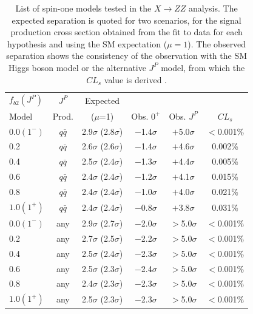 \begin{table}
  \centering
\caption[List of spin-one models tested in the $X \to ZZ$ analysis.
The expected separation is quoted for two scenarios, for the signal production cross section
obtained from the fit to data for each hypothesis and using the SM expectation ($\mu=1$).
The observed separation shows the consistency of the observation with the SM Higgs boson model
or the alternative $J^{P}$ model, from which the $CL_{s}$ value is derived.]{
List of spin-one models tested in the $X \to ZZ$ analysis.
The expected separation is quoted for two scenarios, for the signal production cross section
obtained from the fit to data for each hypothesis and using the SM expectation ($\mu=1$).
The observed separation shows the consistency of the observation with the SM Higgs boson model
or the alternative $J^{P}$ model, from which the $CL_{s}$ value is derived \cite{Khachatryan:2014kca}.
\label{tab:jpmodels_1}
}
\begin{tabular}{lccccc}
$f_{b2} (J^P)$                 & $J^P$        &        Expected  &                       &                    &               \\
Model                          & Prod. &        ($\mu$=1) &  Obs. $0^+$  & Obs. $J^P$ & $CL_{s}$ \\
    \hline
     $0.0 (1^-)$             & $q\bar{q}$    &  2.9$\sigma$ (2.8$\sigma$)   & $-$1.4$\sigma$ & $+$5.0$\sigma$ & $<$0.001\%  \\
    0.2      & $q\bar{q}$    &  2.6$\sigma$ (2.6$\sigma$)   & $-$1.4$\sigma$ & $+$4.6$\sigma$ & 0.002\%  \\
    0.4      & $q\bar{q}$    &  2.5$\sigma$ (2.4$\sigma$)   & $-$1.3$\sigma$ & $+$4.4$\sigma$ & 0.005\% \\
    0.6      & $q\bar{q}$    &  2.4$\sigma$ (2.4$\sigma$)   & $-$1.2$\sigma$ & $+$4.1$\sigma$ &  0.015\% \\
    0.8      & $q\bar{q}$    &  2.4$\sigma$ (2.4$\sigma$)   & $-$1.0$\sigma$ & $+$4.0$\sigma$ &  0.021\%  \\
    $1.0 (1^+)$             & $q\bar{q}$    &  2.4$\sigma$ (2.4$\sigma$)   & $-$0.8$\sigma$ & $+$3.8$\sigma$ &  0.031\%  \\
   \hline
    $0.0 (1^-)$             & any               &  2.9$\sigma$ (2.7$\sigma$)   & $-$2.0$\sigma$ & $>$5.0$\sigma$ & $<$0.001\%  \\
    0.2      & any               &  2.7$\sigma$ (2.5$\sigma$)   & $-$2.2$\sigma$ & $>$5.0$\sigma$ & $<$0.001\%  \\
    0.4      & any               &  2.5$\sigma$ (2.4$\sigma$)   & $-$2.3$\sigma$ & $>$5.0$\sigma$ & $<$0.001\% \\
    0.6      & any               &  2.5$\sigma$ (2.3$\sigma$)   & $-$2.4$\sigma$ & $>$5.0$\sigma$ & $<$0.001\%  \\
    0.8      & any               &  2.4$\sigma$ (2.3$\sigma$)   & $-$2.3$\sigma$ & $>$5.0$\sigma$ & $<$0.001\%  \\
    $1.0 (1^+)$             & any               &  2.5$\sigma$ (2.3$\sigma$)   & $-$2.3$\sigma$ & $>$5.0$\sigma$ & $<$0.001\%  \\
  \end{tabular}
\end{table}

